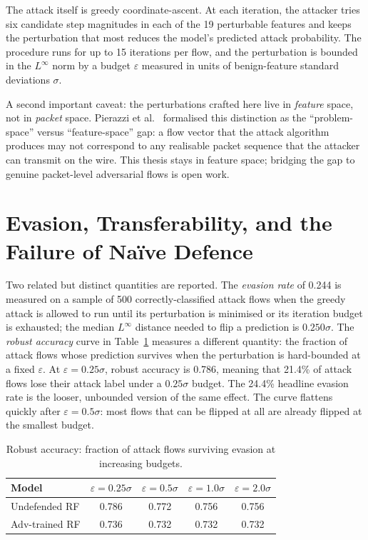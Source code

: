 The attack itself is greedy coordinate-ascent. At each iteration, the
attacker tries six candidate step magnitudes in each of the 19
perturbable features and keeps the perturbation that most reduces the
model's predicted attack probability. The procedure runs for up to 15
iterations per flow, and the perturbation is bounded in the $L^\infty$
norm by a budget $\varepsilon$ measured in units of benign-feature
standard deviations $\sigma$.

A second important caveat: the perturbations crafted here live in
\textit{feature} space, not in \textit{packet} space. Pierazzi et
al.~\cite{Pierazzi2020} formalised this distinction as the
``problem-space'' versus ``feature-space'' gap: a flow vector that the
attack algorithm produces may not correspond to any realisable packet
sequence that the attacker can transmit on the wire. This thesis stays
in feature space; bridging the gap to genuine packet-level adversarial
flows is open work.

\section{Evasion, Transferability, and the Failure of Naïve Defence}

Two related but distinct quantities are reported. The \emph{evasion
rate} of 0.244 is measured on a sample of 500 correctly-classified
attack flows when the greedy attack is allowed to run until its
perturbation is minimised or its iteration budget is exhausted; the
median $L^\infty$ distance needed to flip a prediction is $0.250\sigma$.
The \emph{robust accuracy} curve in Table~\ref{tab:robust-acc} measures
a different quantity: the fraction of attack flows whose prediction
survives when the perturbation is hard-bounded at a fixed $\varepsilon$.
At $\varepsilon = 0.25\sigma$, robust accuracy is 0.786, meaning that
21.4\% of attack flows lose their attack label under a $0.25\sigma$
budget. The 24.4\% headline evasion rate is the looser, unbounded
version of the same effect. The curve flattens quickly after
$\varepsilon = 0.5\sigma$: most flows that can be flipped at all are
already flipped at the smallest budget.

\begin{table}[H]
    \centering
    \caption{Robust accuracy: fraction of attack flows surviving evasion at increasing budgets.}
    \label{tab:robust-acc}
    \small
    \begin{tabular}{lcccc}
        \toprule
        \textbf{Model} & \textbf{$\varepsilon = 0.25\sigma$} & \textbf{$\varepsilon = 0.5\sigma$} & \textbf{$\varepsilon = 1.0\sigma$} & \textbf{$\varepsilon = 2.0\sigma$} \\
        \midrule
        Undefended RF & 0.786 & 0.772 & 0.756 & 0.756 \\
        Adv-trained RF & 0.736 & 0.732 & 0.732 & 0.732 \\
        \bottomrule
    \end{tabular}
\end{table}

